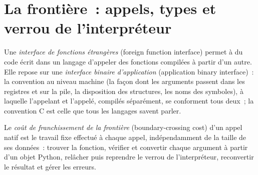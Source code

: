 \label{lst:pl:native-extensions:kernels}

\section{La frontière~: appels, types et verrou de l'interpréteur}

\begin{definition}\label{def:pl:native-extensions:ffi}
Une \emph{interface de fonctions étrangères} (foreign function interface) permet à du code écrit dans un langage d'appeler des fonctions compilées à partir d'un autre.
Elle repose sur une \emph{interface binaire d'application} (application binary interface)~: la convention au niveau machine (la façon dont les arguments
passent dans les registres et sur la pile, la disposition des structures, les noms des symboles), à laquelle l'appelant et l'appelé, compilés
séparément, se conforment tous deux~; la convention C est celle que tous les langages savent parler.
\end{definition}

\begin{definition}\label{def:pl:native-extensions:crossing}
Le \emph{coût de franchissement de la frontière} (boundary-crossing cost) d'un appel natif est le travail fixe effectué à chaque appel, indépendamment de
la taille de ses données~: trouver la fonction, vérifier et convertir chaque argument à partir d'un objet Python, relâcher puis reprendre le verrou de l'interpréteur,
reconvertir le résultat et gérer les erreurs.
\end{definition}

